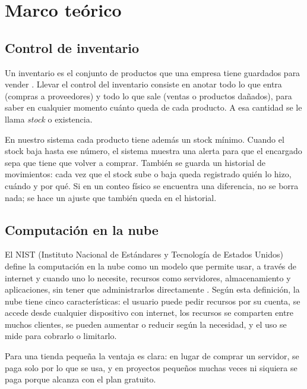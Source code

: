 \documentclass[12pt,a4paper]{article}
\begin{document}
\section{Marco teórico}\label{sec:marco}

\subsection{Control de inventario}

Un inventario es el conjunto de productos que una empresa tiene guardados para vender \cite{heizer}. Llevar el control del inventario consiste en anotar todo lo que entra (compras a proveedores) y todo lo que sale (ventas o productos dañados), para saber en cualquier momento cuánto queda de cada producto. A esa cantidad se le llama \textit{stock} o existencia.

En nuestro sistema cada producto tiene además un stock mínimo. Cuando el stock baja hasta ese número, el sistema muestra una alerta para que el encargado sepa que tiene que volver a comprar. También se guarda un historial de movimientos: cada vez que el stock sube o baja queda registrado quién lo hizo, cuándo y por qué. Si en un conteo físico se encuentra una diferencia, no se borra nada; se hace un ajuste que también queda en el historial.

\subsection{Computación en la nube}

El NIST (Instituto Nacional de Estándares y Tecnología de Estados Unidos) define la computación en la nube como un modelo que permite usar, a través de internet y cuando uno lo necesite, recursos como servidores, almacenamiento y aplicaciones, sin tener que administrarlos directamente \cite{nist}. Según esta definición, la nube tiene cinco características: el usuario puede pedir recursos por su cuenta, se accede desde cualquier dispositivo con internet, los recursos se comparten entre muchos clientes, se pueden aumentar o reducir según la necesidad, y el uso se mide para cobrarlo o limitarlo.

Para una tienda pequeña la ventaja es clara: en lugar de comprar un servidor, se paga solo por lo que se usa, y en proyectos pequeños muchas veces ni siquiera se paga porque alcanza con el plan gratuito.
\end{document}
